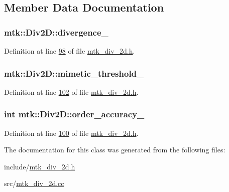 \subsection{Member Data Documentation}
\hypertarget{classmtk_1_1Div2D_a354633b23820bc2dbdd643cd5f8d7561}{
\subsubsection[{divergence\+\_\+}]{ mtk\+::\+Div2\+D\+::divergence\+\_\+\hspace{0.3cm}{\ttfamily [private]}}}\label{classmtk_1_1Div2D_a354633b23820bc2dbdd643cd5f8d7561}


Definition at line \hyperlink{mtk__div__2d_8h_source_l00098}{98} of file \hyperlink{mtk__div__2d_8h_source}{mtk\+\_\+div\+\_\+2d.\+h}.

\hypertarget{classmtk_1_1Div2D_a3d1b25cc7275588221e78ade7f80ce25}{
\subsubsection[{mimetic\+\_\+threshold\+\_\+}]{ mtk\+::\+Div2\+D\+::mimetic\+\_\+threshold\+\_\+\hspace{0.3cm}{\ttfamily [private]}}}\label{classmtk_1_1Div2D_a3d1b25cc7275588221e78ade7f80ce25}


Definition at line \hyperlink{mtk__div__2d_8h_source_l00102}{102} of file \hyperlink{mtk__div__2d_8h_source}{mtk\+\_\+div\+\_\+2d.\+h}.

\hypertarget{classmtk_1_1Div2D_a8502e254d1642bfdff16766dcde83381}{
\subsubsection[{order\+\_\+accuracy\+\_\+}]{\setlength{\rightskip}{0pt plus 5cm}int mtk\+::\+Div2\+D\+::order\+\_\+accuracy\+\_\+\hspace{0.3cm}{\ttfamily [private]}}}\label{classmtk_1_1Div2D_a8502e254d1642bfdff16766dcde83381}


Definition at line \hyperlink{mtk__div__2d_8h_source_l00100}{100} of file \hyperlink{mtk__div__2d_8h_source}{mtk\+\_\+div\+\_\+2d.\+h}.



The documentation for this class was generated from the following files\+:\begin{DoxyCompactItemize}
\item 
include/\hyperlink{mtk__div__2d_8h}{mtk\+\_\+div\+\_\+2d.\+h}\item 
src/\hyperlink{mtk__div__2d_8cc}{mtk\+\_\+div\+\_\+2d.\+cc}\end{DoxyCompactItemize}
